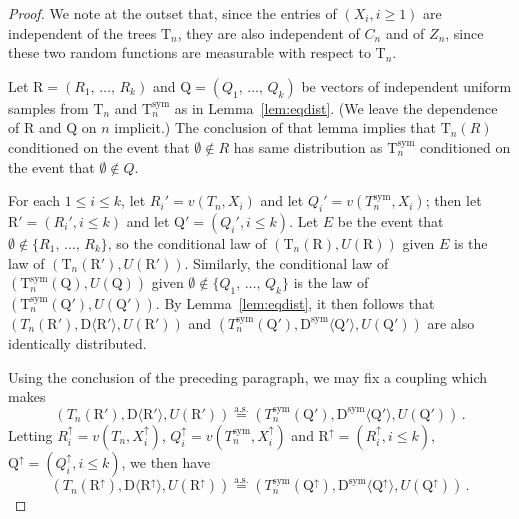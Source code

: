 \documentclass[AHL,Unicode,longabstracts,published]{cedram}
\newcommand{\rD}{\mathrm{D}}
\newcommand{\rQ}{\mathrm{Q}}
\newcommand{\rR}{\mathrm{R}}
\newcommand{\rT}{\mathrm{T}}
\DeclareMathOperator{\sym}{sym}
\newcommand{\unif}{\ensuremath{X}}
\newcommand{\angles}[1]{\langle #1 \rangle}
\newcommand{\aseq}{\ensuremath{\stackrel{\mathrm{a.s.}}{=}}}
\begin{document}
\begin{proof}
We note at the outset that, since the entries of $(X_i,i \ge 1)$ are independent of the trees $\rT_n$, they are also independent of $C_n$ and of $Z_n$, since these two random functions are measurable with respect to $\rT_n$.

Let $\rR=(R_1,\,\ldots,\,R_k)$ and $\rQ=(Q_1,\,\ldots,\,Q_k)$ be vectors of independent uniform samples from $\rT_n$ and $\rT_n^{\sym}$ as in Lemma~\ref{lem:eqdist}. (We leave the dependence of $\rR$ and $\rQ$ on $n$ implicit.) The conclusion of that lemma implies that $\rT_n(R)$ conditioned on the event that $\emptyset \notin R$ has same distribution as $\rT_n^{\sym}$ conditioned on the event that $\emptyset \notin Q$.


For each $1 \le i \le k$, let $R_i'=v(T_n,\unif_i)$ and let $Q_i' = v(T_n^{\sym},\unif_i)$; then let $\rR'=(R_i',i \le k)$ and let $\rQ'=(Q_i',i \le k)$. Let $E$ be the event that $\emptyset \not \in \{R_1,\,\ldots,\,R_k\}$, so the conditional law of $(\rT_n(\rR),U(\rR))$ given $E$ is the law of $(\rT_n(\rR'),U(\rR'))$. Similarly, the conditional law of $(\rT_n^{\sym}(\rQ),U(\rQ))$ given $\emptyset \not \in \{Q_1,\,\ldots,\,Q_k\}$ is the law of $(\rT^{\sym}_n(\rQ'),U(\rQ'))$. By Lemma~\ref{lem:eqdist}, it then follows that $(T_n(\rR'),\rD\angles{\rR'},U(\rR'))$ and $(T_n^{\sym}(\rQ'),\rD^{\sym}\angles{\rQ'},U(\rQ'))$ are also identically distributed.

Using the conclusion of the preceding paragraph, we may fix a coupling which makes
\[
\left(T_n(\rR'),\rD\angles{\rR'},U(\rR')\right)\aseq \left(T_n^{\sym}(\rQ'),\rD^{\sym}\angles{\rQ'},U(\rQ')\right)\,.
\]
Letting $R_i^\uparrow = v(T_n,\unif_i^\uparrow)$, $Q_i^\uparrow = v(T_n^{\sym},\unif_i^\uparrow)$ and $\rR^\uparrow = (R_i^\uparrow,i \le k)$, $\rQ^\uparrow = (Q_i^\uparrow,i \le k)$, we then have
\begin{equation}\label{eq:as_qr_identity}
\left(T_n\left(\rR^{\uparrow}\right),\rD\angles{\rR^{\uparrow}},U\left(\rR^{\uparrow}\right)\right)\aseq \left(T_n^{\sym}\left(\rQ^{\uparrow}\right),\rD^{\sym}\angles{\rQ^{\uparrow}},U\left(\rQ^{\uparrow}\right)\right)\,.
\end{equation}


\end{proof}
\end{document}
